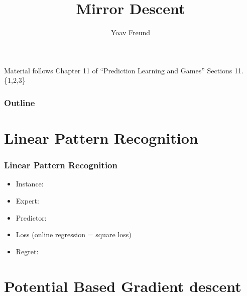 \documentclass[handout]{beamer}
\title[\ouralg] %
{Mirror Descent}
\author[Freund] %
{Yoav Freund}
\institute[Universities of Somewhere and Elsewhere] %
\begin{document}

\begin{frame}
  \titlepage
  \begin{small}
    Material follows Chapter 11 of ``Prediction Learning and
    Games'' Sections 11.\{1,2,3\}
  \end{small}
\end{frame}

\begin{frame}
  \frametitle{Outline}
  \tableofcontents[pausesections]
\end{frame}

\section{Linear Pattern Recognition}
\begin{frame}
  \frametitle{Linear Pattern Recognition}
  \begin{itemize}
  \item Instance: 
  \item Expert: 
  \item Predictor: 
  \item Loss  (online regression = square loss)
  \item Regret: 
  \end{itemize}
\end{frame}

\section{Potential Based Gradient descent}
\end{document}
